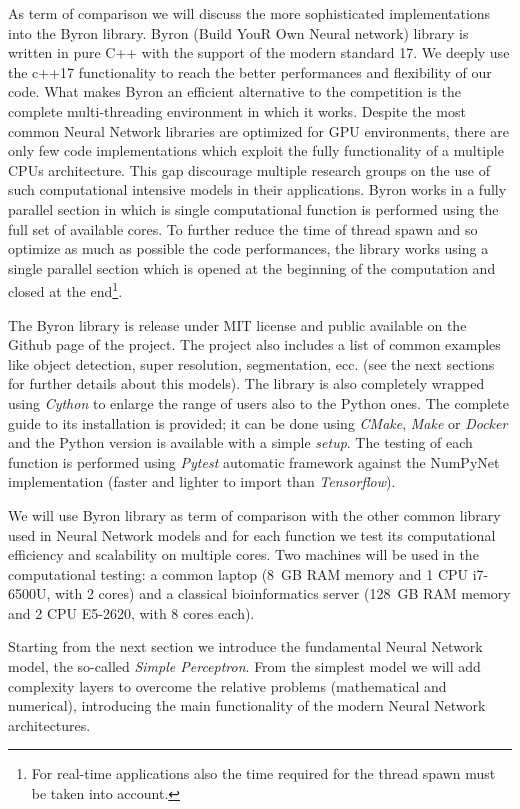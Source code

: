 \documentclass{standalone}
\begin{document}
As term of comparison we will discuss the more sophisticated implementations into the Byron library.
Byron (Build YouR Own Neural network) library is written in pure C++ with the support of the modern standard 17.
We deeply use the c++17 functionality to reach the better performances and flexibility of our code.
What makes Byron an efficient alternative to the competition is the complete multi-threading environment in which it works.
Despite the most common Neural Network libraries are optimized for GPU environments, there are only few code implementations which exploit the fully functionality of a multiple CPUs architecture.
This gap discourage multiple research groups on the use of such computational intensive models in their applications.
Byron works in a fully parallel section in which is single computational function is performed using the full set of available cores.
To further reduce the time of thread spawn and so optimize as much as possible the code performances, the library works using a single parallel section which is opened at the beginning of the computation and closed at the end\footnote{
  For real-time applications also the time required for the thread spawn must be taken into account.
}.

The Byron library is release under MIT license and public available on the Github page of the project.
The project also includes a list of common examples like object detection, super resolution, segmentation, ecc. (see the next sections for further details about this models).
The library is also completely wrapped using \emph{Cython} to enlarge the range of users also to the Python ones.
The complete guide to its installation is provided; it can be done using \emph{CMake}, \emph{Make} or \emph{Docker} and the Python version is available with a simple \emph{setup}.
The testing of each function is performed using \emph{Pytest} automatic framework against the NumPyNet implementation (faster and lighter to import than \emph{Tensorflow}).

We will use Byron library as term of comparison with the other common library used in Neural Network models and for each function we test its computational efficiency and scalability on multiple cores.
Two machines will be used in the computational testing: a common laptop (8~GB RAM memory and 1 CPU i7-6500U, with 2 cores) and a classical bioinformatics server (128~GB RAM memory and 2 CPU E5-2620, with 8 cores each).

Starting from the next section we introduce the fundamental Neural Network model, the so-called \emph{Simple Perceptron}.
From the simplest model we will add complexity layers to overcome the relative problems (mathematical and numerical), introducing the main functionality of the modern Neural Network architectures.
\end{document}
